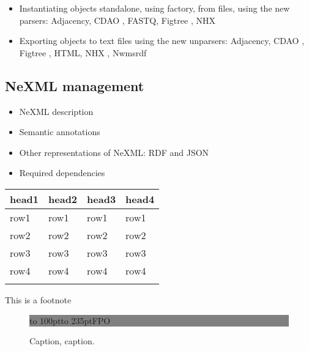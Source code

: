 \documentclass{bioinfo}
\begin{document}
\begin{itemize}
\item Instantiating objects standalone, using factory, from files, using the new parsers: 
Adjacency, CDAO \citep{prosdocimi2009initial}, FASTQ, Figtree \citep{rambaut2007figtree}, 
NHX \citep{zmasek2001atv}
\item Exporting objects to text files using the new unparsers: Adjacency, CDAO 
\citep{prosdocimi2009initial}, Figtree \citep{rambaut2007figtree}, HTML, NHX 
\citep{zmasek2001atv}, Nwmsrdf
\end{itemize}

\subsection{NeXML management}

\begin{itemize}
\item NeXML description
\item Semantic annotations
\item Other representations of NeXML: RDF and JSON
\item Required dependencies
\end{itemize}

\begin{table}[!t]
 {\begin{tabular}{@{}llll@{}}\toprule head1 &
head2 & head3 & head4\\\midrule
row1 & row1 & row1 & row1\\
row2 & row2 & row2 & row2\\
row3 & row3 & row3 & row3\\
row4 & row4 & row4 & row4\\\botrule
\end{tabular}}{This is a footnote}
\end{table}

\begin{figure}[!tpb]%
\fboxsep=0pt\colorbox{gray}{\begin{minipage}[t]{235pt} \vbox to 100pt{\vfill\hbox to
235pt{\hfill\fontsize{24pt}{24pt}\selectfont FPO\hfill}\vfill}
\end{minipage}}
\caption{Caption, caption.}\label{fig:01}
\end{figure}
\end{document}
